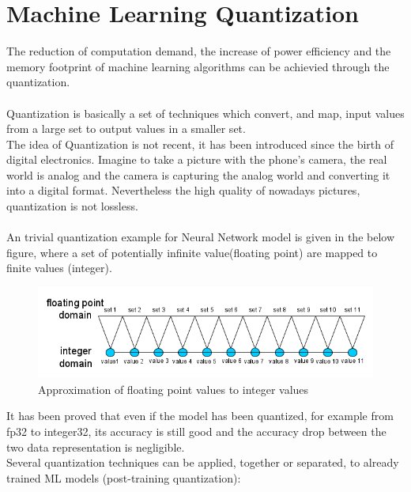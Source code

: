 \section{Machine Learning Quantization}
The reduction of computation demand, the increase of power efficiency and the memory footprint of machine learning algorithms can be achievied through the quantization.\\\\

Quantization is basically a set of techniques which convert, and map, input values from a large set to output values in a smaller set.\\The idea of Quantization is not recent, it has been introduced since the birth of digital electronics. Imagine to take a picture with the phone's camera, the real world is analog and the camera is capturing the analog world and converting it into a digital format.  Nevertheless the high quality of nowadays pictures, quantization is not lossless.\\\\
An trivial quantization example for Neural Network model is given in the below figure, where a set of potentially infinite value(floating point) are mapped to finite values (integer).
\begin{figure}[H]
\centering
\captionsetup{justification=centering}
\includegraphics[scale=0.55]{./figure/quant.png}
\caption{Approximation of floating point values to integer values}
\label{fig:quant}
\end{figure}
It has been proved that even if the model has been quantized, for example from fp32 to integer32, its accuracy is still good and the accuracy drop between the two data representation is negligible\cite{paper:8}.\\
Several quantization techniques can be applied, together or separated, to already trained ML models (post-training quantization):
